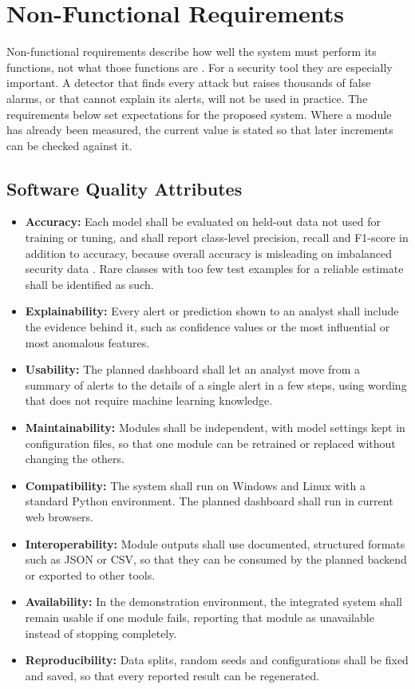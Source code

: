 \section{Non-Functional Requirements}

Non-functional requirements describe how well the system must perform its functions, not what those functions are \cite{sommerville2016se,iso29148}. For a security tool they are especially important. A detector that finds every attack but raises thousands of false alarms, or that cannot explain its alerts, will not be used in practice. The requirements below set expectations for the proposed system. Where a module has already been measured, the current value is stated so that later increments can be checked against it.

\subsection{Software Quality Attributes}

\begin{itemize}
   \setlength{\itemsep}{1pt}
   \setlength{\parskip}{0pt}
   \setlength{\parsep}{0pt}
   \item \textbf{Accuracy:} Each model shall be evaluated on held-out data not used for training or tuning, and shall report class-level precision, recall and F1-score in addition to accuracy, because overall accuracy is misleading on imbalanced security data \cite{saito2015pr}. Rare classes with too few test examples for a reliable estimate shall be identified as such.
   \item \textbf{Explainability:} Every alert or prediction shown to an analyst shall include the evidence behind it, such as confidence values or the most influential or most anomalous features.
   \item \textbf{Usability:} The planned dashboard shall let an analyst move from a summary of alerts to the details of a single alert in a few steps, using wording that does not require machine learning knowledge.
   \item \textbf{Maintainability:} Modules shall be independent, with model settings kept in configuration files, so that one module can be retrained or replaced without changing the others.
   \item \textbf{Compatibility:} The system shall run on Windows and Linux with a standard Python environment. The planned dashboard shall run in current web browsers.
   \item \textbf{Interoperability:} Module outputs shall use documented, structured formats such as JSON or CSV, so that they can be consumed by the planned backend or exported to other tools.
   \item \textbf{Availability:} In the demonstration environment, the integrated system shall remain usable if one module fails, reporting that module as unavailable instead of stopping completely.
   \item \textbf{Reproducibility:} Data splits, random seeds and configurations shall be fixed and saved, so that every reported result can be regenerated.
\end{itemize}

